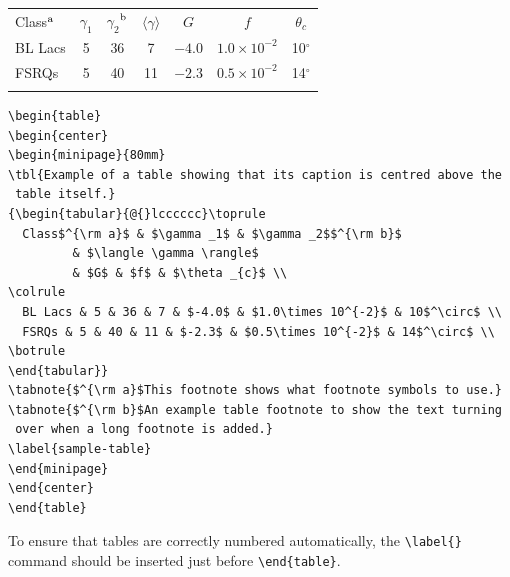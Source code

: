 \documentclass{rQUF2e}
\theoremstyle{plain}
\theoremstyle{definition}
\theoremstyle{remark}
\begin{document}
\begin{table}
\begin{center}
\begin{minipage}{80mm}
{\begin{tabular}{@{}lcccccc}\toprule
  Class$^{\rm a}$ & $\gamma _1$ & $\gamma _2$$^{\rm b}$
         & $\langle \gamma \rangle$
         & $G$ & $f$ & $\theta _{c}$ \\
\colrule
  BL Lacs & 5 & 36 & 7 & $-4.0$ & $1.0\times 10^{-2}$ & 10$^\circ$ \\
  FSRQs & 5 & 40 & 11 & $-2.3$ & $0.5\times 10^{-2}$ & 14$^\circ$ \\
\botrule
\end{tabular}}
\label{sample-table}
\end{minipage}
\end{center}
\end{table}

\begin{verbatim}
\begin{table}
\begin{center}
\begin{minipage}{80mm}
\tbl{Example of a table showing that its caption is centred above the
 table itself.}
{\begin{tabular}{@{}lcccccc}\toprule
  Class$^{\rm a}$ & $\gamma _1$ & $\gamma _2$$^{\rm b}$
         & $\langle \gamma \rangle$
         & $G$ & $f$ & $\theta _{c}$ \\
\colrule
  BL Lacs & 5 & 36 & 7 & $-4.0$ & $1.0\times 10^{-2}$ & 10$^\circ$ \\
  FSRQs & 5 & 40 & 11 & $-2.3$ & $0.5\times 10^{-2}$ & 14$^\circ$ \\
\botrule
\end{tabular}}
\tabnote{$^{\rm a}$This footnote shows what footnote symbols to use.}
\tabnote{$^{\rm b}$An example table footnote to show the text turning
 over when a long footnote is added.}
\label{sample-table}
\end{minipage}
\end{center}
\end{table}
\end{verbatim}

To ensure that tables are correctly numbered automatically, the
\verb"\label{}" command should be inserted just before \verb"\end{table}".
\end{document}
